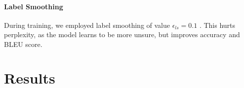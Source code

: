 \documentclass{article}
\begin{document}

\paragraph{Label Smoothing} During training, we employed label smoothing of value $\epsilon_{ls}=0.1$ \citep{DBLP:journals/corr/SzegedyVISW15}.  This hurts perplexity, as the model learns to be more unsure, but improves accuracy and BLEU score.


 
\section{Results} \label{sec:results}
\end{document}
